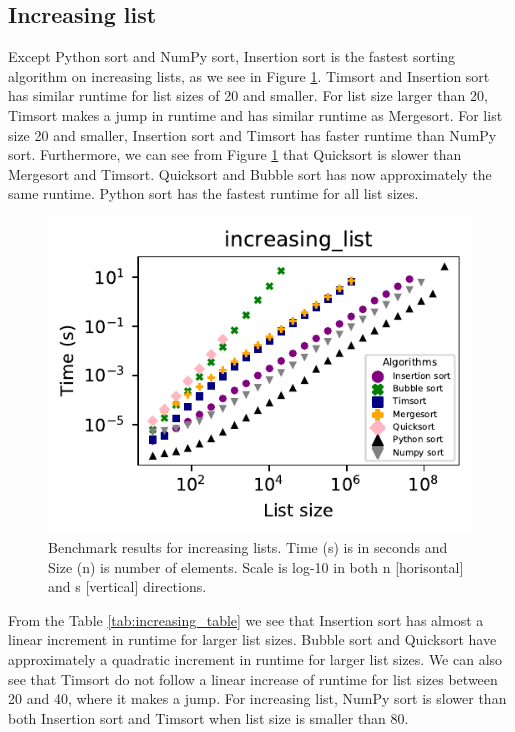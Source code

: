 \documentclass[sigconf, nonacm, natbib, screen, balance=False]{acmart}
\begin{document}
\subsection{Increasing list}

Except Python sort and NumPy sort, Insertion sort is the fastest sorting algorithm on increasing lists, as we see in Figure \ref{fig:increasing}. Timsort and Insertion sort has similar runtime for list sizes of 20 and smaller. For list size larger than 20, Timsort makes a jump in runtime and has similar runtime as Mergesort. For list size 20 and smaller, Insertion sort and Timsort has faster runtime than NumPy sort. Furthermore, we can see from Figure \ref{fig:increasing} that Quicksort is slower than Mergesort and Timsort. Quicksort and Bubble sort has now approximately the same runtime. Python sort has the fastest runtime for all list sizes.     

\begin{figure}[h!]
  \includegraphics[width=\linewidth]{../figures/increasing_list.pdf}
  \caption{Benchmark results for increasing lists. Time (s) is in seconds and Size (n) is number of elements. Scale is log-10 in both n [horisontal] and s [vertical] directions.}
  \label{fig:increasing}
\end{figure}
\FloatBarrier

From the Table \ref{tab:increasing_table} we see that Insertion sort has almost a linear increment in runtime for larger list sizes. Bubble sort and Quicksort have approximately a quadratic increment in runtime for larger list sizes. We can also see that Timsort do not follow a linear increase of runtime for list sizes between 20 and 40, where it makes a jump. For increasing list, NumPy sort is slower than both Insertion sort and Timsort when list size is smaller than 80.
\end{document}
